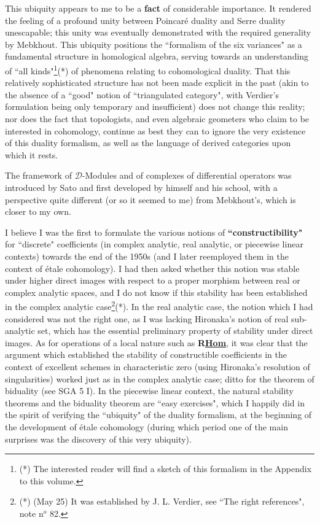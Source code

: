This ubiquity appears to me to be a \textbf{fact} of considerable importance. It rendered the feeling of a profound unity between Poincar\'e duality and Serre duality unescapable; this unity was eventually demonstrated with the required generality by Mebkhout. This ubiquity positions the ``formalism of the six variances" as a fundamental structure in homological algebra, serving towards an understanding of ``all kinds"\footnote{(*) The interested reader will find a sketch of this formalism in the Appendix to this volume.}(*) of phenomena relating to cohomological duality. That this relatively sophisticated structure has not been made explicit in the past (akin to the absence of a ``good" notion of ``triangulated category", with Verdier's formulation being only temporary and insufficient) does not change this reality; nor does the fact that topologists, and even algebraic geometers who claim to be interested in cohomology, continue as best they can to ignore the very existence of this duality formalism, as well as the language of derived categories upon which it rests.

\label{note:46.3}

The framework of $\mathcal{D}$-Modules and of complexes of differential operators was introduced by Sato and first developed by himself and his school, with a perspective quite different (or so it seemed to me) from Mebkhout's, which is closer to my own. 

I believe I was the first to formulate the various notions of \textbf{``constructibility"} for ``discrete" coefficients (in complex analytic, real analytic, or piecewise linear contexts) towards the end of the 1950s (and I later reemployed them in the context of \'etale cohomology). I had then asked whether this notion was stable under higher direct images with respect to a proper morphism between real or complex analytic spaces, and I do not know if this stability has been established in the complex analytic case\footnote{(*) (May 25) It was established by J. L. Verdier, see ``The right references", note n$^o$ 82.}(*). In the real analytic case, the notion which I had considered was not the right one, as I was lacking Hironaka's notion of real sub-analytic set, which has the essential preliminary property of stability under direct images. As for operations of a local nature such as \textbf{R\underline{Hom}}, it was clear that the argument which established the stability of constructible coefficients in the context of excellent schemes in characteristic zero 
(using Hironaka's resolution of singularities) worked just as in the complex analytic case; ditto for the theorem of biduality (see SGA 5 I). In the piecewise linear context, the natural stability theorems and the biduality theorem are ``easy exercises", which I happily did in the spirit of verifying the ``ubiquity" of the duality formalism, at the beginning of the development of \'etale cohomology (during which period one of the main surprises was the discovery of this very ubiquity).

